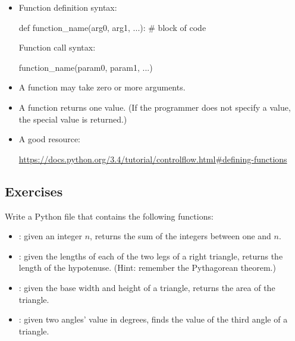 \documentclass[11pt]{cselabheader}
\begin{document}
{\begin{itemize}
  \item Function definition syntax:

    \begin{python3code}
def function_name(arg0, arg1, ...):
    # block of code
    \end{python3code}

    Function call syntax:

    \begin{python3code}
function_name(param0, param1, ...)
    \end{python3code}

  \item A function may take zero or more arguments.

  \item A function returns one value. (If the programmer does not specify a
    value, the special value  is returned.)

  \item A good resource:

\begin{center}
  \url{https://docs.python.org/3.4/tutorial/controlflow.html#defining-functions}
\end{center}

\end{itemize}

\subsection{Exercises}
\label{subsec:funcs.ex}

\begin{ex}[mathutils.py] Write a Python file that contains the following functions:

    \begin{itemize}
      \item {}: given an integer $n$, returns the sum of
        the integers between one and $n$.
      \item {}: given the lengths of each
        of the two legs of a right triangle, returns the length of the
        hypotenuse.  (Hint: remember the Pythagorean theorem.)
      \item {}: given the base width and height of a
        triangle, returns the area of the triangle.
      \item {}: given two angles' value in degrees,
        finds the value of the third angle of a triangle.
    \end{itemize}
\end{ex}

}
\end{document}
